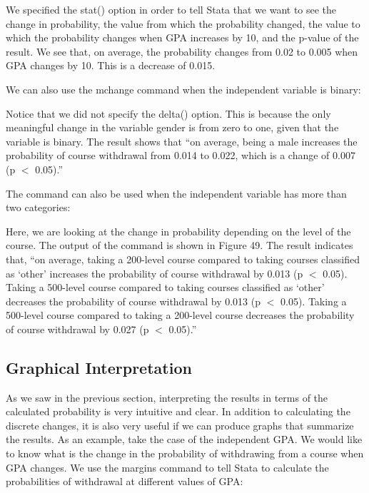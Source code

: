 \documentclass[a4paper,12pt,oneside]{book}
\begin{document}
\begin{stlog}\end{stlog}

We specified the stat() option in order to tell Stata that we want to see the change in probability, the value from which the probability changed, the value to which the probability changes when GPA increases by 10, 
and the p-value of the result. We see that, on average, the probability changes from 0.02 to 0.005 when GPA changes by 10. This is a decrease of 0.015. 

We can also use the mchange command when the independent variable is binary:

\begin{stlog}\end{stlog}

Notice that we did not specify the delta() option. This is because the only meaningful change in the variable gender is from zero to one, given that the variable is binary. The result shows that 
“on average, being a male increases the probability of course withdrawal from 0.014 to 0.022, which is a change of 0.007 (p $<$ 0.05).” 

The command can also be used when the independent variable has more than two categories:

\begin{stlog}\end{stlog}

Here, we are looking at the change in probability depending on the level of the course. The output of the command is shown in Figure 49. The result indicates that, “on average, taking a 
200-level course compared to taking courses classified as ‘other’ increases the probability of course withdrawal by 0.013 (p $<$ 0.05). Taking a 500-level course compared to taking courses 
classified as ‘other’ decreases the probability of course withdrawal by 0.013 (p $<$ 0.05). Taking a 500-level course compared to taking a 200-level course decreases the probability of course withdrawal 
by 0.027 (p $<$ 0.05).”

\subsection{Graphical Interpretation}
As we saw in the previous section, interpreting the results in terms of the calculated probability is very intuitive and clear. In addition to calculating the discrete changes, it is also very useful if we can 
produce graphs that summarize the results. As an example, take the case of the independent GPA. We would like to know what is the change in the probability of withdrawing from a course when GPA changes. 
We use the margins command to tell Stata to calculate the probabilities of withdrawal at different values of GPA:
\end{document}
